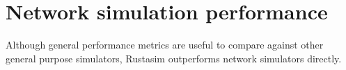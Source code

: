 %
%
%
%
%
%


\section{Network simulation performance} \label{perf-net}

Although general performance metrics are useful to compare against other general purpose simulators, Rustasim outperforms \datacenter network simulators directly.

